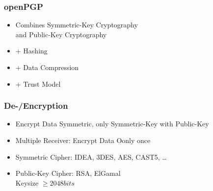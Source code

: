 \documentclass{beamer}
\begin{document}

\begin{frame}
	\frametitle{openPGP}
	
	\begin{itemize}
		\item Combines Symmetric-Key Cryptography \\and Public-Key Cryptography
		\item + Hashing
		\item + Data Compression
		\item + Trust Model 
	\end{itemize}
	
\end{frame}



\begin{frame}

	\frametitle{De-/Encryption}


	\begin{itemize}
		\item Encrypt Data Symmetric, only Symmetric-Key with Public-Key
		\item Multiple Receiver: Encrypt Data Oonly once \\
		\item Symmetric Cipher: IDEA, 3DES, AES, CAST5, \ldots 
		\item Public-Key Cipher: RSA, ElGamal \\
				\small Keysize $\geq 2048 bits$ \cite{nist} 
	\end{itemize}

\end{frame}

\end{document}
